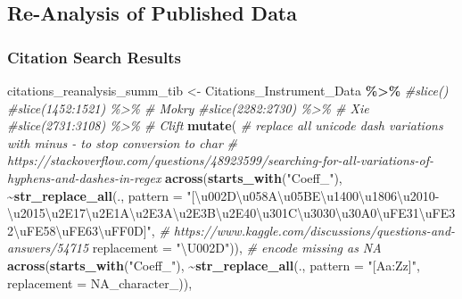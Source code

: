 \documentclass[
]{article}
\newenvironment{Shaded}{\begin{snugshade}}{\end{snugshade}}
\newcommand{\AttributeTok}[1]{\textcolor[rgb]{0.13,0.29,0.53}{#1}}
\newcommand{\CommentTok}[1]{\textcolor[rgb]{0.56,0.35,0.01}{\textit{#1}}}
\newcommand{\ConstantTok}[1]{\textcolor[rgb]{0.56,0.35,0.01}{#1}}
\newcommand{\FunctionTok}[1]{\textcolor[rgb]{0.13,0.29,0.53}{\textbf{#1}}}
\newcommand{\NormalTok}[1]{#1}
\newcommand{\OtherTok}[1]{\textcolor[rgb]{0.56,0.35,0.01}{#1}}
\newcommand{\SpecialCharTok}[1]{\textcolor[rgb]{0.81,0.36,0.00}{\textbf{#1}}}
\newcommand{\StringTok}[1]{\textcolor[rgb]{0.31,0.60,0.02}{#1}}
\begin{document}
\newpage

\subsection{Re-Analysis of Published Data}\label{re-analysis-of-published-data-1}

\subsubsection{Citation Search Results}\label{citation-search-results}

\begin{Shaded}
\begin{Highlighting}[]
\NormalTok{citations\_reanalysis\_summ\_tib }\OtherTok{\textless{}{-}}
\NormalTok{  Citations\_Instrument\_Data }\SpecialCharTok{\%\textgreater{}\%}
  \CommentTok{\#slice()}
  \CommentTok{\#slice(1452:1521) \%\textgreater{}\% \# Mokry}
  \CommentTok{\#slice(2282:2730) \%\textgreater{}\% \# Xie}
  \CommentTok{\#slice(2731:3108) \%\textgreater{}\% \# Clift}
  \FunctionTok{mutate}\NormalTok{(}
      \CommentTok{\# replace all unicode dash variations with minus {-} to stop conversion to char}
      \CommentTok{\# https://stackoverflow.com/questions/48923599/searching{-}for{-}all{-}variations{-}of{-}hyphens{-}and{-}dashes{-}in{-}regex}
      \FunctionTok{across}\NormalTok{(}\FunctionTok{starts\_with}\NormalTok{(}\StringTok{"Coeff\_"}\NormalTok{),}
             \SpecialCharTok{\textasciitilde{}}\FunctionTok{str\_replace\_all}\NormalTok{(.,}
                              \AttributeTok{pattern =} \StringTok{"[\textbackslash{}u002D\textbackslash{}u058A\textbackslash{}u05BE\textbackslash{}u1400\textbackslash{}u1806\textbackslash{}u2010{-}\textbackslash{}u2015\textbackslash{}u2E17\textbackslash{}u2E1A\textbackslash{}u2E3A\textbackslash{}u2E3B\textbackslash{}u2E40\textbackslash{}u301C\textbackslash{}u3030\textbackslash{}u30A0\textbackslash{}uFE31\textbackslash{}uFE32\textbackslash{}uFE58\textbackslash{}uFE63\textbackslash{}uFF0D]"}\NormalTok{,}
                              \CommentTok{\# https://www.kaggle.com/discussions/questions{-}and{-}answers/54715}
                              \AttributeTok{replacement =} \StringTok{"\textbackslash{}U002D"}\NormalTok{)),}
      \CommentTok{\# encode missing as NA}
      \FunctionTok{across}\NormalTok{(}\FunctionTok{starts\_with}\NormalTok{(}\StringTok{"Coeff\_"}\NormalTok{), }\SpecialCharTok{\textasciitilde{}}\FunctionTok{str\_replace\_all}\NormalTok{(., }\AttributeTok{pattern =} \StringTok{"[Aa:Zz]"}\NormalTok{, }\AttributeTok{replacement =} \ConstantTok{NA\_character\_}\NormalTok{)),}

\end{Highlighting}
\end{Shaded}
\end{document}
